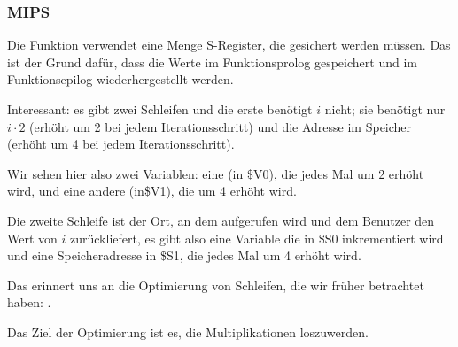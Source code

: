 \subsubsection{MIPS}
Die Funktion verwendet eine Menge S-Register, die gesichert werden müssen. Das ist der Grund dafür, dass die Werte im
Funktionsprolog gespeichert und im Funktionsepilog wiederhergestellt werden.


Interessant: es gibt zwei Schleifen und die erste benötigt $i$ nicht; sie benötigt nur $i\cdot 2$ (erhöht um 2 bei
jedem Iterationsschritt) und die Adresse im Speicher (erhöht um 4 bei jedem Iterationsschritt).

Wir sehen hier also zwei Variablen: eine (in \$V0), die jedes Mal um 2 erhöht wird, und eine andere (in\$V1), die um 4
erhöht wird.

Die zweite Schleife ist der Ort, an dem \printf aufgerufen wird und dem Benutzer den Wert von $i$ zurückliefert, es gibt
also eine Variable die in \$S0 inkrementiert wird und eine Speicheradresse in \$S1, die jedes Mal um 4 erhöht wird.

Das erinnert uns an die Optimierung von Schleifen, die wir früher betrachtet haben: .

Das Ziel der Optimierung ist es, die Multiplikationen loszuwerden.
